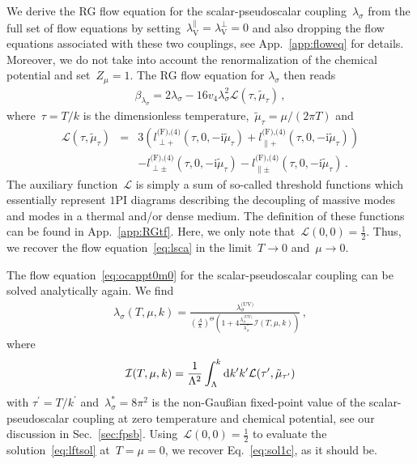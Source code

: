 \documentclass[prd,english,preprintnumbers,amsmath,amssymb,nofootinbib,twocolumn,superscriptaddress]{revtex4-1}
\newcommand{\I}{\mathrm{i}}
\newcommand{\be}{\begin{eqnarray}}
\newcommand{\ee}{\end{eqnarray}}
\newcommand{\nn}{\nonumber }
\begin{document}
{We derive the RG flow
equation for the scalar-pseudoscalar coupling~$\lambda_{\sigma}$ from the full set of flow equations by 
setting~$\lambda_{\text{V}}^{\parallel}=\lambda_{\text{V}}^{\perp}=0$ and also dropping the flow equations associated with these
two couplings, see App.~\ref{app:floweq} for details. 
Moreover, we do not take into account the renormalization of the chemical potential and set~$Z_{\mu}=1$. 
The RG flow equation for $\lambda_\sigma$ then reads
%
\be
\beta_{\lambda_\sigma} = 2 \lambda_\sigma - 16 v_4 \lambda_\sigma ^2 {\mathcal L}(\tau,\tilde{\mu}_{\tau})\,,
\label{eq:ocappt0m0}
\ee
%
where~$\tau=T/k$ is the dimensionless temperature,~$\tilde{\mu}_{\tau}=\mu/(2\pi T)$ and
%
\be
\!\!\!\!\!\! {\mathcal L}(\tau,\tilde{\mu}_{\tau}) &=&
 3 \left(l^\text{(F),(4)}_{\perp +} (\tau, 0,-\I\tilde{\mu}_{\tau}) +  l^\text{(F),(4)}_{\parallel +} (\tau, 0, -\I\tilde{\mu}_{\tau})\right)\nn\\
 && - l^\text{(F),(4)}_{\perp \pm} (\tau, 0, -\I\tilde{\mu}_{\tau}) -  l^\text{(F),(4)}_{\parallel \pm} (\tau, 0,-\I\tilde{\mu}_{\tau})\,.
 \label{eq:lscat}
\ee
%
The auxiliary function~$\mathcal L$ is simply a sum of so-called threshold functions which essentially represent $1$PI diagrams
describing the decoupling of massive modes and modes in a thermal and/or dense medium. The definition of these
functions can be found in App.~\ref{app:RGtf}. Here, we only note that~${\mathcal L}(0,0)=\frac{1}{2}$. Thus, we recover the
flow equation~\eqref{eq:lsca} in the limit~$T\to 0$ and~$\mu\to 0$.

The flow equation~\eqref{eq:ocappt0m0} for the scalar-pseudoscalar coupling can be solved analytically again. We find
%
\be
\lambda_{\sigma}(T,\mu,k) = \frac{\lambda_\sigma^\text{(UV)}}{\left(\frac{\Lambda}{k}\right)^{\Theta}
\left(1+ 4\frac{\lambda_\sigma^\text{(UV)}}{\lambda_{\sigma}^{\ast}} {\mathcal I}(T,\mu,k)\right)}\,,
\label{eq:lftsol}
\ee
%
{where
%
\be
{\mathcal I}(T,\mu,k) = \frac{1}{\Lambda^2} \int_\Lambda^k {\rm d} k^{\prime} k^{\prime} {\mathcal L}(\tau^{\prime}, \tilde{\mu}_{\tau^{\prime}})
\ee
%
with} $\tau^{\prime}=T/k^{\prime}$ and~$\lambda_{\sigma}^{\ast}=8\pi^2$ is the non-Gau\ss ian fixed-point value of the scalar-pseudoscalar coupling
at zero temperature and chemical potential, see our discussion in Sec.~\ref{sec:fpsb}.
Using~${\mathcal L}(0,0)=\frac{1}{2}$ to evaluate the solution~\eqref{eq:lftsol} at~$T=\mu=0$, we recover
Eq.~\eqref{eq:sol1c}, as it should be. 

}
\end{document}
